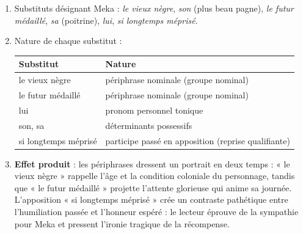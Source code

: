 \documentclass[11pt]{article}
\begin{document}
\begin{corrige}
\begin{enumerate}
\item Substituts désignant Meka : \emph{le vieux nègre}, \emph{son} (plus beau pagne), \emph{le futur médaillé}, \emph{sa} (poitrine), \emph{lui}, \emph{si longtemps méprisé}.
\item Nature de chaque substitut :
\begin{center}
\begin{tabularx}{\linewidth}{|l|X|}
\hline
\rowcolor{popblueL} \textbf{Substitut} & \textbf{Nature} \\
\hline
le vieux nègre & périphrase nominale (groupe nominal) \\
le futur médaillé & périphrase nominale (groupe nominal) \\
lui & pronom personnel tonique \\
son, sa & déterminants possessifs \\
si longtemps méprisé & participe passé en apposition (reprise qualifiante) \\
\hline
\end{tabularx}
\end{center}
\item \textbf{Effet produit} : les périphrases dressent un portrait en deux temps : « le vieux nègre » rappelle l'âge et la condition coloniale du personnage, tandis que « le futur médaillé » projette l'attente glorieuse qui anime sa journée. L'apposition « si longtemps méprisé » crée un contraste pathétique entre l'humiliation passée et l'honneur espéré : le lecteur éprouve de la sympathie pour Meka et pressent l'ironie tragique de la récompense.
\end{enumerate}
\end{corrige}
\end{document}
